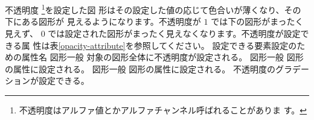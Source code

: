 \section{}
不透明度
\footnote{不透明度はアルファ値とかアルファチャンネル呼ばれることがありま
す。}を設定した図
形はその設定した値の応じて色合いが薄くなり、その下にある図形が
見えるようになります。不透明度が $1$ では下の図形がまったく見えず、
$0$ では設定された図形がまったく見えなくなります。不透明度が設定できる属
性は表\ref{opacity-attribute}を参照してください。
{{ 設定できる要素}{設定のための属性名}{}
{図形一般}{}
     {対象の図形全体に不透明度が設定される。}
{図形一般}{}
    {図形の属性に設定される。}
{図形一般}{}
    {図形の属性に設定される。}
{}{}
    {不透明度のグラデーションが設定できる。}}

\iffalse
不透明度 $0$ の部分の図形は見えませんが、存在はします。
図形をまったく見せなくする方法としては属性\Attrib{visibility}を
\AttribAVal{hidden}{}に設定する方法もあります。これについては
\ref{visibility-hidden}を参照してください。
「不透明度を $0$ する」と「属性\Attrib{visibility}を
\AttribAVal{hidden}{}に設定する」%
の違いはインターラクティブな\SVG を作成した場合に表れます。
\fi

